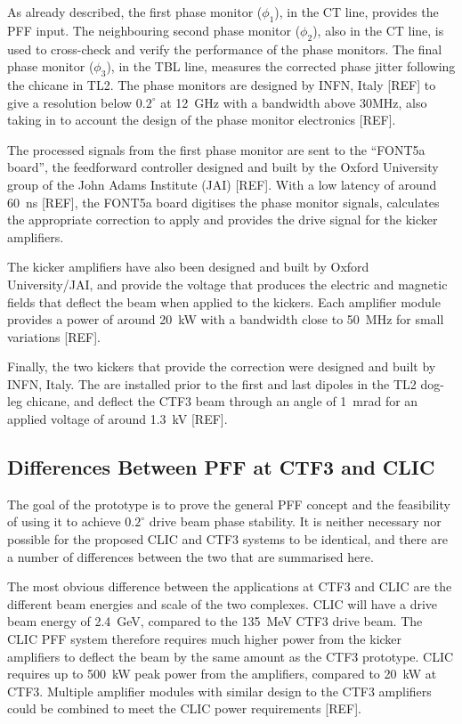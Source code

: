 As already described, the first phase monitor (\(\phi_1\)), in the CT line, provides the PFF input. The neighbouring second phase monitor (\(\phi_2\)), also in the CT line, is used to cross-check and verify the performance of the phase monitors. The final phase monitor (\(\phi_3\)), in the TBL line, measures the corrected phase jitter following the chicane in TL2. The phase monitors are designed by INFN, Italy [REF] to give a resolution below \(0.2^\circ\) at 12~GHz with a bandwidth above 30MHz, also taking in to account the  design of the phase monitor electronics [REF].

The processed signals from the first phase monitor are sent to the ``FONT5a board'', the feedforward controller designed and built by the Oxford University group of the John Adams Institute (JAI) [REF]. With a low latency of around 60~ns [REF], the FONT5a board digitises the phase monitor signals, calculates the appropriate correction to apply and provides the drive signal for the kicker amplifiers.

The kicker amplifiers have also been designed and built by Oxford University/JAI, and provide the voltage that produces the electric and magnetic fields that deflect the beam when applied to the kickers. Each amplifier module provides a power of around 20~kW with a bandwidth close to 50~MHz for small variations [REF]. 

Finally, the two kickers that provide the correction were designed and built by INFN, Italy. The are installed prior to the first and last dipoles in the TL2 dog-leg chicane, and deflect the CTF3 beam through an angle of 1~mrad for an applied voltage of around 1.3~kV [REF].


\subsection{Differences Between PFF at CTF3 and CLIC}
\label{ss:ctfVsCLIC}

The goal of the prototype is to prove the general PFF concept and the feasibility of using it to achieve \(0.2^\circ\) drive beam phase stability. It is neither necessary nor possible for the proposed CLIC and CTF3 systems to be identical, and there are a number of differences between the two that are summarised here. 

The most obvious difference between the applications at CTF3 and CLIC are the different beam energies and scale of the two complexes. CLIC will have a drive beam energy of 2.4~GeV, compared to the 135~MeV CTF3 drive beam. The CLIC PFF system therefore requires much higher power from the kicker amplifiers to deflect the beam by the same amount as the CTF3 prototype. CLIC requires up to 500~kW peak power from the amplifiers, compared to 20~kW at CTF3. Multiple amplifier modules with similar design to the CTF3 amplifiers could be combined to meet the CLIC power requirements [REF].

